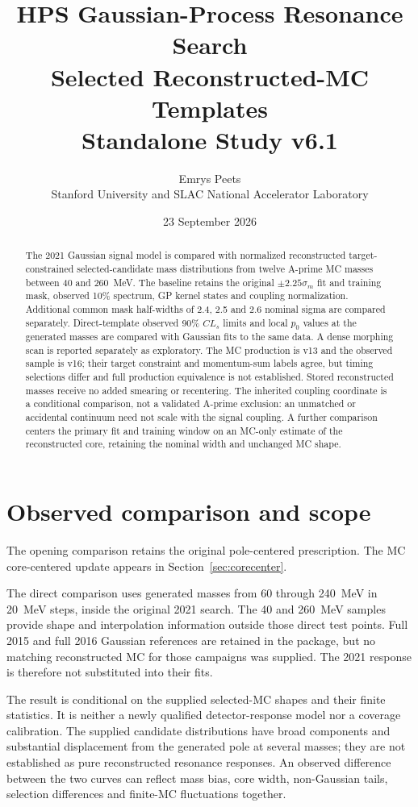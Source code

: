 \documentclass[11pt]{article}
\title{HPS Gaussian-Process Resonance Search\\[.5em]
\large Selected Reconstructed-MC Templates\\Standalone Study v6.1}
\author{Emrys Peets\\Stanford University and SLAC National Accelerator Laboratory}
\date{23 September 2026}
\begin{document}
\maketitle
\begin{abstract}
The 2021 Gaussian signal model is compared with normalized reconstructed
target-constrained selected-candidate mass distributions from twelve A-prime MC
masses between 40 and 260~MeV. The baseline retains the original $\pm2.25\sigma_m$ fit and
training mask, observed 10\% spectrum, GP kernel states and coupling
normalization. Additional common mask half-widths of 2.4, 2.5 and 2.6
nominal sigma are compared separately. Direct-template observed 90\% $CL_s$ limits
and local $p_0$ values at the generated masses are compared with Gaussian
fits to the same data. A dense morphing scan is reported separately as
exploratory. The MC production is v13 and the observed sample is v16;
their target constraint and momentum-sum labels agree, but timing
selections differ and full production equivalence is not established.
Stored reconstructed masses receive no added smearing or recentering.
The inherited coupling coordinate is a conditional comparison, not a
validated A-prime exclusion: an unmatched or accidental continuum need
not scale with the signal coupling.
A further comparison centers the primary fit and training window on an MC-only estimate of the reconstructed core, retaining the nominal width and unchanged MC shape.
\end{abstract}

\section{Observed comparison and scope}
The opening comparison retains the original pole-centered prescription.
The MC core-centered update appears in Section~\ref{sec:corecenter}.


The direct comparison uses generated masses from 60 through 240~MeV in
20~MeV steps, inside the original 2021 search. The 40 and 260~MeV samples
provide shape and interpolation information outside those direct test
points. Full 2015 and full 2016 Gaussian references are retained in the
package, but no matching reconstructed MC for those campaigns was
supplied. The 2021 response is therefore not substituted into their fits.

The result is conditional on the supplied selected-MC shapes and their
finite statistics. It is neither a newly qualified detector-response
model nor a coverage calibration. The supplied candidate distributions
have broad components and substantial displacement from the generated
pole at several masses; they are not established as pure reconstructed
resonance responses. An observed difference between the two
curves can reflect mass bias, core width, non-Gaussian tails, selection
differences and finite-MC fluctuations together.
\end{document}
